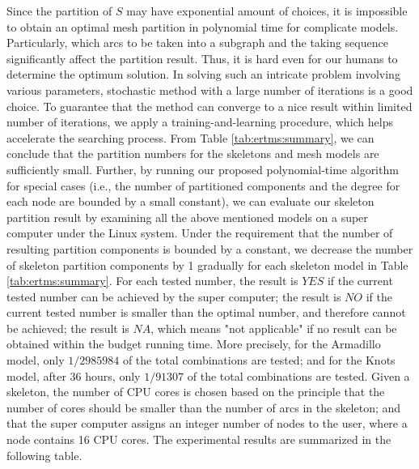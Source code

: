 Since the partition of $S$ may have exponential amount of choices, it is impossible to obtain an optimal mesh partition in polynomial time for complicate models. Particularly, which arcs to be taken into a subgraph and the taking sequence significantly affect the partition result. Thus, it is hard even for our humans to determine the optimum solution. In solving such an intricate problem involving various parameters, stochastic method with a large number of iterations is a good choice. To guarantee that the method can converge to a nice result within limited number of iterations, we apply a training-and-learning procedure, which helps accelerate the searching process. From Table \ref{tab:ertms:summary}, we can conclude that the partition numbers for the skeletons and mesh models are sufficiently small. Further, by running our proposed polynomial-time algorithm for special cases (i.e., the number of partitioned components and the degree for each node are bounded by a small constant), we can evaluate our skeleton partition result by examining all the above mentioned models on a super computer under the Linux system. Under the requirement that the number of resulting partition components is bounded by a constant, we decrease the number of skeleton partition components by 1 gradually for each skeleton model in Table \ref{tab:ertms:summary}.  For each tested number, the result is $YES$ if the current tested number can be achieved by the super computer; the result is $NO$ if the current tested number is smaller than the optimal number, and therefore cannot be achieved; the result is $NA$, which means "not applicable" if no result can be obtained within the budget running time. More precisely, for the Armadillo model, only $1/2985984$ of the total combinations are tested; and for the Knots model, after 36 hours, only $1/91307$ of the total combinations are tested. Given a skeleton, the number of CPU cores is chosen based on the principle that the number of cores should be smaller than the number of arcs in the skeleton; and that the super computer assigns an integer number of nodes to the user, where a node contains 16 CPU cores. The experimental results are summarized in the following table.

